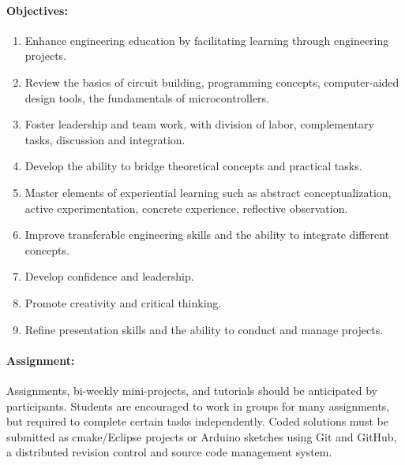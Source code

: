 \documentclass{article}
\begin{document}
\paragraph{Objectives:}
\begin{enumerate}
\item
Enhance engineering education by facilitating learning through engineering projects.

\item
Review the basics of circuit building, programming concepts, computer-aided design tools, the fundamentals of microcontrollers.

\item
Foster leadership and team work, with division of labor, complementary tasks, discussion and integration.

\item
Develop the ability to bridge theoretical concepts and practical tasks.

\item
Master elements of experiential learning such as abstract conceptualization, active experimentation, concrete experience, reflective observation.

\item
Improve transferable engineering skills and the ability to integrate different concepts.

\item
Develop confidence and leadership.

\item
Promote creativity and critical thinking.

\item
Refine presentation skills and the ability to conduct and manage projects.
\end{enumerate}

\paragraph{Assignment:}
Assignments, bi-weekly mini-projects, and tutorials should be anticipated by participants.
Students are encouraged to work in groups for many assignments, but required to complete certain tasks independently.
Coded solutions must be submitted as cmake/Eclipse projects or Arduino sketches using Git and GitHub, a distributed revision control and source code management system.
\end{document}
